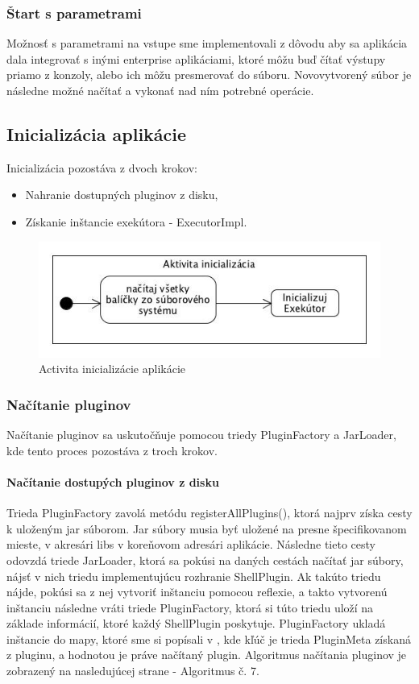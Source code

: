 {\subsubsection{Štart s parametrami}
\indent Možnosť s parametrami na vstupe sme implementovali z dôvodu aby sa aplikácia dala integrovať s inými enterprise aplikáciami, ktoré môžu buď čítať výstupy priamo z konzoly, alebo ich môžu presmerovať do súboru. Novovytvorený súbor je následne možné načítať a vykonať nad ním potrebné operácie.

\subsection{Inicializácia aplikácie}
\indent Inicializácia pozostáva z dvoch krokov:
\begin{itemize}
	\item Nahranie dostupných pluginov z disku,
	\item Získanie inštancie exekútora - ExecutorImpl.
\end{itemize}
\begin{figure}[H]
	\centering
	\includegraphics[scale=0.8]{img/initialization.jpg}
	\caption{Activita inicializácie aplikácie}
	\label{fig:test}
\end{figure}
\subsubsection{Načítanie pluginov}
\indent Načítanie pluginov sa uskutočňuje pomocou triedy PluginFactory a JarLoader, kde tento proces pozostáva z troch krokov.\newline
\paragraph{Načítanie dostupých pluginov z disku} Trieda PluginFactory zavolá metódu registerAllPlugins(), ktorá najprv získa cesty k uloženým jar súborom. Jar súbory musia byť uložené na presne špecifikovanom mieste, v akresári libs v koreňovom adresári aplikácie. Následne tieto cesty odovzdá triede JarLoader, ktorá sa pokúsi na daných cestách načítať \acrshort{jar} súbory, nájsť v nich triedu implementujúcu rozhranie ShellPlugin. Ak takúto triedu nájde, pokúsi sa z nej vytvoriť inštanciu pomocou reflexie, a takto vytvorenú inštanciu následne vráti triede PluginFactory, ktorá si túto triedu uloží na základe informácií, ktoré každý ShellPlugin poskytuje. PluginFactory ukladá inštancie do mapy, ktoré sme si popísali v , kde kľúč je trieda PluginMeta získaná z pluginu, a hodnotou je práve načítaný plugin. Algoritmus načítania pluginov je zobrazený na nasledujúcej strane - Algoritmus č. 7.
}
